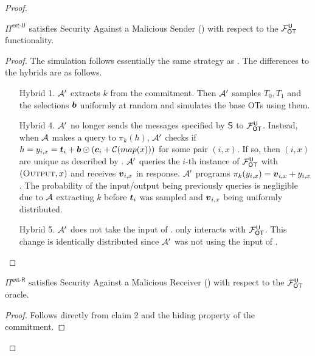 \begin{proof}\label{proof:ext_U_U}
	\begin{claim}\label{claim:ext-U-U-MalSender}
		$\Pi^{\textsf{ext-U}}$ satisfies Security Against a Malicious Sender () with respect to the $\OOT^\U$ functionality.
	\end{claim}
	\begin{proof}
		The simulation follows essentially the same strategy as .
		The differences to the hybrids are as follows.
		\begin{enumerate}[leftmargin=1.8cm]
			\item[Hybrid 1.] $\Adv'$ extracts $k$ from the commitment. Then $\Adv'$ samples $T_0,T_1$ and the selections $\bb$ uniformly at random and simulates the base OTs using them.
			
			\item[Hybrid 4.] $\Adv'$ no longer sends the messages specified by $\send$ to $\OOT^\U$. Instead, when $\Adv$ makes a query to $\pi_k(h)$, $\Adv'$ checks if $h=y_{i,x}=\tt_i +\bb\odot( \cc_i + \mathcal{C}(map(x)))$ for some pair $(i,x)$. If so, then $(i,x)$ are unique as described by . $\Adv'$ queries the $i$-th instance of $\OOT^\U$ with $(\textsc{Output}, x)$ and receives $\vv_{i,x}$ in response. $\Adv'$ programs $\pi_k(y_{i,x})=\vv_{i,x}+y_{i,x}$. The probability of the input/output being previously queries is negligible due to $\Adv$ extracting $k$ before $\tt_i$ was sampled and $\vv_{i,x}$ being uniformly distributed.
			
			\item[Hybrid 5.] $\Adv'$ does not take the input of \rec. \rec only interacts with $\OOT^\U$. This change is identically distributed since $\Adv'$ was not using the input of \rec.
		\end{enumerate}
	\end{proof}
	\begin{claim}\label{claim:ext-U-U-MalReceiver}
		$\Pi^{\textsf{ext-R}}$ satisfies Security Against a Malicious Receiver () with respect to the $\OOT^\U$ oracle.
	\end{claim}
	\begin{proof}
		Follows directly from  claim 2 and the hiding property of the commitment. 
		\pe
	\end{proof}
	\pe
\end{proof}